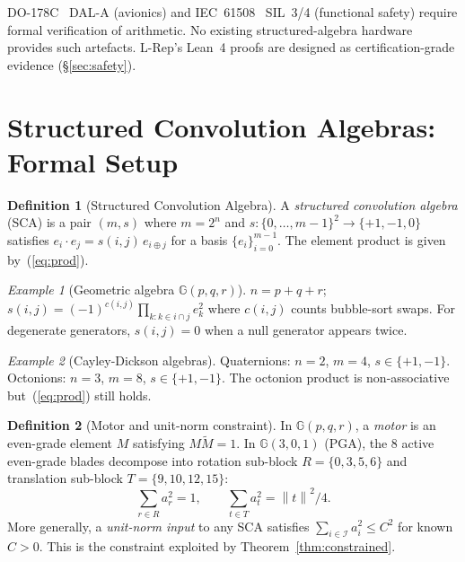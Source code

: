 \documentclass[11pt,a4paper]{article}
\theoremstyle{definition}
\newtheorem{definition}{Definition}[section]
\theoremstyle{plain}
\theoremstyle{remark}
\newtheorem{example}{Example}[section]
\newcommand{\GA}{\mathbb{G}}
\newcommand{\norm}[1]{\left\|#1\right\|}
\begin{document}
DO-178C~\cite{do178c} DAL-A (avionics) and IEC~61508~\cite{iec61508}
SIL~3/4 (functional safety) require formal verification of arithmetic.
No existing structured-algebra hardware provides such artefacts.
L-Rep's Lean~4 proofs are designed as certification-grade evidence
(\S\ref{sec:safety}).

\section{Structured Convolution Algebras: Formal Setup}
\label{sec:prelim}

\begin{definition}[Structured Convolution Algebra]
\label{def:sca}
A \emph{structured convolution algebra} (SCA) is a pair $(m, s)$ where
$m=2^n$ and $s:\{0,\ldots,m-1\}^2\to\{+1,-1,0\}$ satisfies
$e_i\cdot e_j = s(i,j)\,e_{i\oplus j}$ for a basis $\{e_i\}_{i=0}^{m-1}$.
The element product is given by~(\ref{eq:prod}).
\end{definition}

\begin{example}[Geometric algebra $\GA(p,q,r)$]
$n=p+q+r$; $s(i,j)=(-1)^{c(i,j)}\prod_{k:k\in i\cap j}e_k^2$ where
$c(i,j)$ counts bubble-sort swaps.
For degenerate generators, $s(i,j)=0$ when a null generator appears twice.
\end{example}

\begin{example}[Cayley-Dickson algebras]
Quaternions: $n=2$, $m=4$, $s\in\{+1,-1\}$.
Octonions: $n=3$, $m=8$, $s\in\{+1,-1\}$.
The octonion product is non-associative but~(\ref{eq:prod}) still holds.
\end{example}

\begin{definition}[Motor and unit-norm constraint]
\label{def:motor}
In $\GA(p,q,r)$, a \emph{motor} is an even-grade element $M$ satisfying
$M\tilde{M}=1$.
In $\GA(3,0,1)$ (PGA), the 8 active even-grade blades decompose into
rotation sub-block $R=\{0,3,5,6\}$ and translation sub-block $T=\{9,10,12,15\}$:
\begin{equation}\label{eq:motor-norm}
  \sum_{r\in R} a_r^2 = 1, \qquad
  \sum_{t\in T} a_t^2 = \norm{t}^2/4.
\end{equation}
More generally, a \emph{unit-norm input} to any SCA satisfies
$\sum_{i\in\mathcal{I}} a_i^2 \le C^2$ for known $C>0$.
This is the constraint exploited by Theorem~\ref{thm:constrained}.
\end{definition}
\end{document}
